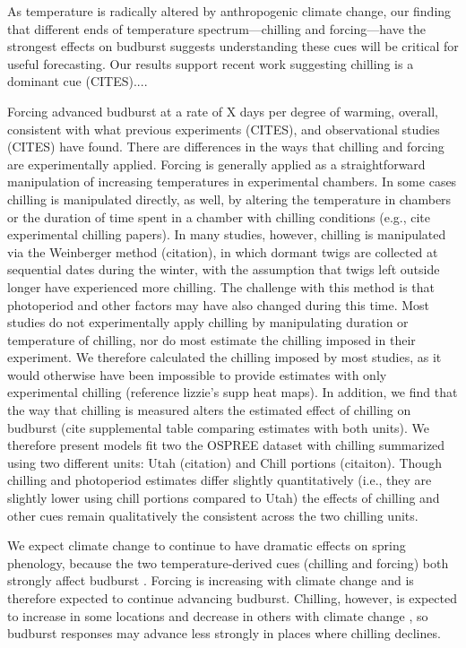 \documentclass[11pt,letter]{article}
\begin{document}
\par As temperature is radically altered by anthropogenic climate change, our finding that different ends of temperature spectrum---chilling and forcing---have the strongest effects on budburst suggests understanding these cues will be critical for useful forecasting. Our results support recent work suggesting chilling is a dominant cue (CITES).... %

Forcing advanced budburst at a rate of X days per degree of warming, overall, consistent with what previous experiments (CITES), and observational studies (CITES) have found. There are differences in the ways that chilling and forcing are experimentally applied. Forcing is generally applied as a straightforward manipulation of increasing temperatures in experimental chambers. In some cases chilling is manipulated directly, as well, by altering the temperature in chambers or the duration of time spent in a chamber with chilling conditions (e.g., cite experimental chilling papers). In many studies, however, chilling is manipulated via the Weinberger method (citation), in which dormant twigs are collected at sequential dates during the winter, with the assumption that twigs left outside longer have experienced more chilling. The challenge with this method is that photoperiod and other factors may have also changed during this time. Most studies do not experimentally apply chilling by manipulating duration or temperature of chilling, nor do most estimate the chilling imposed in their experiment. We therefore calculated the chilling imposed by most studies, as it would otherwise have been impossible to provide estimates with only experimental chilling (reference lizzie's supp heat maps). %
In addition, we find that the way that chilling is measured alters the estimated effect of chilling on budburst (cite supplemental table comparing estimates with both units). We therefore present models fit two the OSPREE dataset with chilling summarized using two different units: Utah (citation) and Chill portions (citaiton). Though chilling and photoperiod estimates differ slightly quantitatively (i.e., they are slightly lower using chill portions compared to Utah) the effects of chilling and other cues remain qualitatively the consistent across the two chilling units.  

\par We expect climate change to continue to have dramatic effects on spring phenology, because the two temperature-derived cues (chilling and forcing)  both strongly affect budburst  \citep{Laube2014a}. Forcing is increasing with climate change and is therefore expected to continue advancing budburst. Chilling, however, is expected to increase in some locations and decrease in others with climate change  \citep{fraga2019}, so budburst responses may advance less strongly in places where chilling declines. 
  
\end{document}
